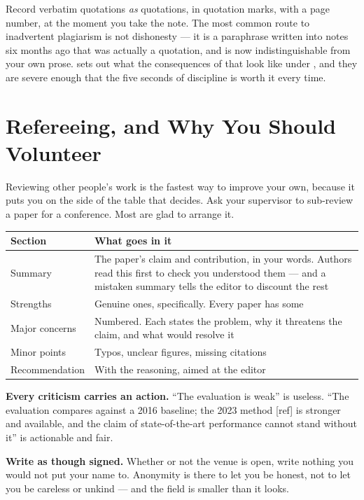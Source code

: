 \begin{alertbox}
Record verbatim quotations \emph{as} quotations, in quotation marks, with a
page number, at the moment you take the note. The most common route to
inadvertent plagiarism is not dishonesty --- it is a paraphrase written into
notes six months ago that was actually a quotation, and is now indistinguishable
from your own prose.  sets out what the consequences of that
look like under , and they are severe enough that the
five seconds of discipline is worth it every time.
\end{alertbox}

\section{Refereeing, and Why You Should Volunteer}

Reviewing other people's work is the fastest way to improve your own, because
it puts you on the side of the table that decides. Ask your supervisor to
sub-review a paper for a conference. Most are glad to arrange it.

\begin{center}
\small
\begin{tabular}{@{}L{3.2cm}L{11.1cm}@{}}
\toprule
\textbf{Section} & \textbf{What goes in it} \\
\midrule
Summary        & The paper's claim and contribution, in your words. Authors
                 read this first to check you understood them --- and a
                 mistaken summary tells the editor to discount the rest \\
Strengths      & Genuine ones, specifically. Every paper has some \\
Major concerns & Numbered. Each states the problem, why it threatens the
                 claim, and what would resolve it \\
Minor points   & Typos, unclear figures, missing citations \\
Recommendation & With the reasoning, aimed at the editor \\
\bottomrule
\end{tabular}
\end{center}

\begin{conceptbox}
\textbf{Every criticism carries an action.} ``The evaluation is weak'' is
useless. ``The evaluation compares against a 2016 baseline; the 2023 method
[ref] is stronger and available, and the claim of state-of-the-art performance
cannot stand without it'' is actionable and fair.

\medskip
\textbf{Write as though signed.} Whether or not the venue is open, write
nothing you would not put your name to. Anonymity is there to let you be
honest, not to let you be careless or unkind --- and the field is smaller than
it looks.
\end{conceptbox}

